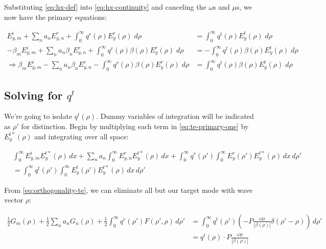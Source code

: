\documentclass[11pt, oneside]{article}   	%
\begin{document}
\noindent Substituting \eqref{eq:hx-def} into \eqref{eq:hx-continuity} and canceling the $\omega$s and $\mu$s, we now have the primary equations:

\begin{align}
E_{y,m}^{i} + \sum_{n} a_{n} E_{y,n}^{r} + \int_{0}^{\infty} q^{r}(\rho) E_{y}^{r}(\rho) \; d\rho &= \int_{0}^{\infty} q^{t} (\rho) E_{y}^{t} (\rho) \; d\rho \label{eq:te-primary-one}\\
-\beta_{m} E_{y,m}^{i} + \sum_{n} a_{n} \beta_{n} E_{y,n}^{r} + \int_{0}^{\infty} q^{r}(\rho) \beta (\rho) E_{y}^{r}(\rho) \; d\rho &= -\int_{0}^{\infty} q^{t} (\rho) \beta (\rho) E_{y}^{t} (\rho) \; d\rho \\
\Rightarrow \beta_{m} E_{y,m}^{i} - \sum_{n} a_{n} \beta_{n} E_{y,n}^{r} - \int_{0}^{\infty} q^{r}(\rho) \beta (\rho) E_{y}^{r}(\rho) \; d\rho &= \int_{0}^{\infty} q^{t} (\rho) \beta (\rho) E_{y}^{t} (\rho) \; d\rho
\label{eq:te-primary-two}
\end{align} 

\subsection{Solving for $q^{t}$}
\label{sec:qt-te}

We're going to isolate $q^{t}(\rho)$. Dummy variables of integration will be indicated as $\rho '$ for distinction. Begin by multiplying each term in \eqref{eq:te-primary-one} by $ E_{y}^{t*}(\rho)$ and integrating over all space:

\begin{align}
&\int_{0}^{\infty} E_{y,m}^{i} E_{y}^{t*}(\rho) \, dx
+ \sum_{n} a_{n} \int_{0}^{\infty}  E_{y,n}^{r} E_{y}^{t*}(\rho) \, dx 
+ \int_{0}^{\infty} q^{r} (\rho ') \int_{0}^{\infty} E_{y}^{r} (\rho ') E_{y}^{t*} (\rho) \, dx \, d\rho ' \nonumber \\
&= \int_{0}^{\infty} q^{t} (\rho ') \int_{0}^{\infty} E_{y}^{t} (\rho ') E_{y}^{t*} (\rho) \, dx \, d\rho '
\end{align}

\noindent From \eqref{eq:orthogonality-te}, we can eliminate all but our target mode with wave vector $\rho$:

\begin{align}
\frac{1}{2}G_{m}(\rho)
+ \frac{1}{2} \sum_{n} a_{n} G_{n}(\rho)
+ \frac{1}{2} \int_{0}^{\infty} q^{r} (\rho ') F(\rho ',\rho) \, d\rho '
&= \int_{0}^{\infty} q^{t} (\rho ') \left(-P \frac{\omega \mu}{|\beta (\rho)|} \delta (\rho '-\rho) \right) \, d\rho ' \nonumber \\
&= q^{t}(\rho) \cdot P \frac{\omega \mu}{|\beta (\rho)|}
\label{eq:orthogonalized-one-qt-te}
\end{align}
\end{document}
